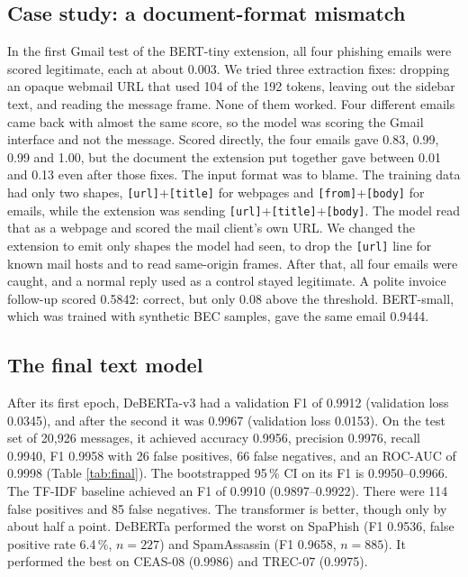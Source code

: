 \documentclass[conference]{IEEEtran}
\begin{document}
\subsection{Case study: a document-format mismatch}
In the first Gmail test of the BERT-tiny extension, all four phishing emails were scored legitimate, each at about 0.003. We tried three extraction fixes: dropping an opaque webmail URL that used 104 of the 192 tokens, leaving out the sidebar text, and reading the message frame. None of them worked. Four different emails came back with almost the same score, so the model was scoring the Gmail interface and not the message. Scored directly, the four emails gave 0.83, 0.99, 0.99 and 1.00, but the document the extension put together gave between 0.01 and 0.13 even after those fixes. The input format was to blame. The training data had only two shapes, \texttt{[url]}+\texttt{[title]} for webpages and \texttt{[from]}+\texttt{[body]} for emails, while the extension was sending \texttt{[url]}+\texttt{[title]}+\texttt{[body]}. The model read that as a webpage and scored the mail client's own URL. We changed the extension to emit only shapes the model had seen, to drop the \texttt{[url]} line for known mail hosts and to read same-origin frames. After that, all four emails were caught, and a normal reply used as a control stayed legitimate. A polite invoice follow-up scored 0.5842: correct, but only 0.08 above the threshold. BERT-small, which was trained with synthetic BEC samples, gave the same email 0.9444.

\subsection{The final text model}
After its first epoch, DeBERTa-v3 had a validation F1 of 0.9912 (validation loss 0.0345), and after the second it was 0.9967 (validation loss 0.0153). On the test set of 20,926 messages, it achieved accuracy 0.9956, precision 0.9976, recall 0.9940, F1 0.9958 with 26 false positives, 66 false negatives, and an ROC-AUC of 0.9998 (Table \ref{tab:final}). The bootstrapped 95\,\% CI on its F1 is 0.9950--0.9966. The TF-IDF baseline achieved an F1 of 0.9910 (0.9897--0.9922). There were 114 false positives and 85 false negatives. The transformer is better, though only by about half a point. DeBERTa performed the worst on SpaPhish (F1 0.9536, false positive rate 6.4\,\%, $n = 227$) and SpamAssassin (F1 0.9658, $n = 885$). It performed the best on CEAS-08 (0.9986) and TREC-07 (0.9975).
\end{document}
